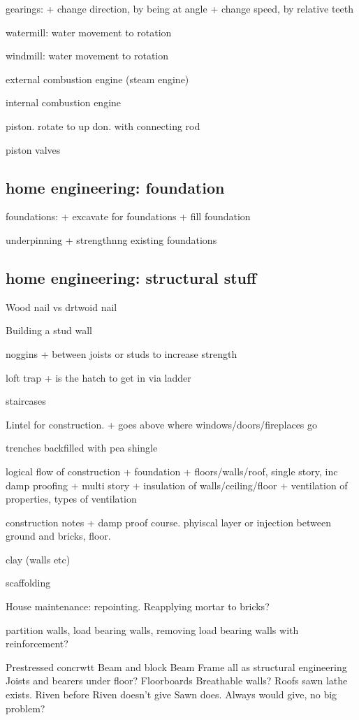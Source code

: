 gearings:
+ change direction, by being at angle
+ change speed, by relative teeth

watermill: water movement to rotation

windmill: water movement to rotation

external combustion engine (steam engine)

internal combustion engine

piston. rotate to up don. with connecting rod

piston valves
\subsection{home engineering: foundation}

foundations:
+ excavate for foundations
+ fill foundation

underpinning
+ strengthnng existing foundations

\subsection{home engineering: structural stuff}
Wood nail vs drtwoid nail

Building a stud wall

noggins
+ between joists or studs to increase strength

loft trap
+ is the hatch to get in via ladder

staircases

Lintel for construction.
+ goes above where windows/doors/fireplaces go

trenches backfilled with pea shingle

logical flow of construction
+ foundation
+ floors/walls/roof, single story, inc damp proofing
+ multi story
+ insulation of walls/ceiling/floor
+ ventilation of properties, types of ventilation

construction notes
+ damp proof course. phyiscal layer or injection between ground and bricks, floor.

clay (walls etc)

scaffolding

House maintenance: repointing. Reapplying mortar to bricks?

partition walls, load bearing walls, removing load bearing walls with reinforcement?

Prestressed concrwtt
Beam and block
Beam
Frame all as structural engineering
Joists and bearers under floor?
Floorboards
Breathable walls?
Roofs
sawn lathe exists.
Riven before
Riven doesn't give
Sawn does.
Always would give, no big problem?
